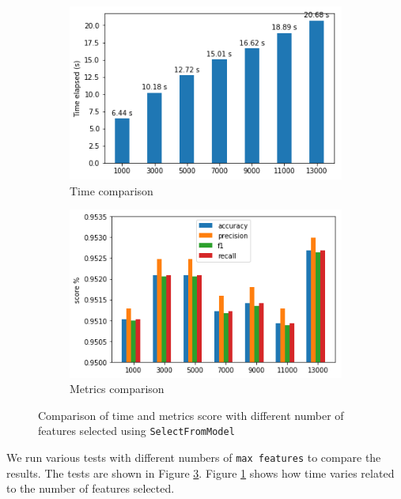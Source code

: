 \begin{figure}[]
	\centering
	\begin{subfigure}[t]{0.48\textwidth}
		\centering
		\includegraphics[width=\linewidth]{selmodel-time.png}
		\caption{Time comparison}\label{fig:model-time}		
	\end{subfigure}
	\begin{subfigure}[t]{0.48\textwidth}
		\centering
		\includegraphics[width=\linewidth]{selmodel-metrics.png}
		\caption{Metrics comparison}\label{fig:model-metrics}
	\end{subfigure}
	\caption{Comparison of time and metrics score with different number of features selected using \texttt{SelectFromModel}}\label{fig:model}
\end{figure}


We run various tests with different numbers of \texttt{max	features} to compare the results. The tests are shown in Figure \ref{fig:model}. Figure \ref{fig:model-time} shows how time varies related to the number of features selected.

